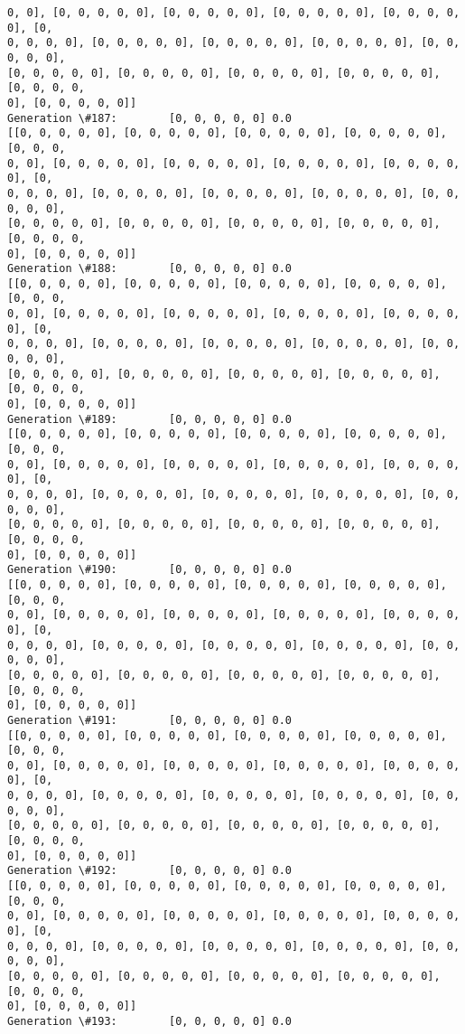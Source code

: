 \documentclass[11pt]{article}
\begin{document}
\begin{Verbatim}[commandchars=\\\{\}]
0, 0], [0, 0, 0, 0, 0], [0, 0, 0, 0, 0], [0, 0, 0, 0, 0], [0, 0, 0, 0, 0], [0,
0, 0, 0, 0], [0, 0, 0, 0, 0], [0, 0, 0, 0, 0], [0, 0, 0, 0, 0], [0, 0, 0, 0, 0],
[0, 0, 0, 0, 0], [0, 0, 0, 0, 0], [0, 0, 0, 0, 0], [0, 0, 0, 0, 0], [0, 0, 0, 0,
0], [0, 0, 0, 0, 0]]
Generation \#187:        [0, 0, 0, 0, 0] 0.0
[[0, 0, 0, 0, 0], [0, 0, 0, 0, 0], [0, 0, 0, 0, 0], [0, 0, 0, 0, 0], [0, 0, 0,
0, 0], [0, 0, 0, 0, 0], [0, 0, 0, 0, 0], [0, 0, 0, 0, 0], [0, 0, 0, 0, 0], [0,
0, 0, 0, 0], [0, 0, 0, 0, 0], [0, 0, 0, 0, 0], [0, 0, 0, 0, 0], [0, 0, 0, 0, 0],
[0, 0, 0, 0, 0], [0, 0, 0, 0, 0], [0, 0, 0, 0, 0], [0, 0, 0, 0, 0], [0, 0, 0, 0,
0], [0, 0, 0, 0, 0]]
Generation \#188:        [0, 0, 0, 0, 0] 0.0
[[0, 0, 0, 0, 0], [0, 0, 0, 0, 0], [0, 0, 0, 0, 0], [0, 0, 0, 0, 0], [0, 0, 0,
0, 0], [0, 0, 0, 0, 0], [0, 0, 0, 0, 0], [0, 0, 0, 0, 0], [0, 0, 0, 0, 0], [0,
0, 0, 0, 0], [0, 0, 0, 0, 0], [0, 0, 0, 0, 0], [0, 0, 0, 0, 0], [0, 0, 0, 0, 0],
[0, 0, 0, 0, 0], [0, 0, 0, 0, 0], [0, 0, 0, 0, 0], [0, 0, 0, 0, 0], [0, 0, 0, 0,
0], [0, 0, 0, 0, 0]]
Generation \#189:        [0, 0, 0, 0, 0] 0.0
[[0, 0, 0, 0, 0], [0, 0, 0, 0, 0], [0, 0, 0, 0, 0], [0, 0, 0, 0, 0], [0, 0, 0,
0, 0], [0, 0, 0, 0, 0], [0, 0, 0, 0, 0], [0, 0, 0, 0, 0], [0, 0, 0, 0, 0], [0,
0, 0, 0, 0], [0, 0, 0, 0, 0], [0, 0, 0, 0, 0], [0, 0, 0, 0, 0], [0, 0, 0, 0, 0],
[0, 0, 0, 0, 0], [0, 0, 0, 0, 0], [0, 0, 0, 0, 0], [0, 0, 0, 0, 0], [0, 0, 0, 0,
0], [0, 0, 0, 0, 0]]
Generation \#190:        [0, 0, 0, 0, 0] 0.0
[[0, 0, 0, 0, 0], [0, 0, 0, 0, 0], [0, 0, 0, 0, 0], [0, 0, 0, 0, 0], [0, 0, 0,
0, 0], [0, 0, 0, 0, 0], [0, 0, 0, 0, 0], [0, 0, 0, 0, 0], [0, 0, 0, 0, 0], [0,
0, 0, 0, 0], [0, 0, 0, 0, 0], [0, 0, 0, 0, 0], [0, 0, 0, 0, 0], [0, 0, 0, 0, 0],
[0, 0, 0, 0, 0], [0, 0, 0, 0, 0], [0, 0, 0, 0, 0], [0, 0, 0, 0, 0], [0, 0, 0, 0,
0], [0, 0, 0, 0, 0]]
Generation \#191:        [0, 0, 0, 0, 0] 0.0
[[0, 0, 0, 0, 0], [0, 0, 0, 0, 0], [0, 0, 0, 0, 0], [0, 0, 0, 0, 0], [0, 0, 0,
0, 0], [0, 0, 0, 0, 0], [0, 0, 0, 0, 0], [0, 0, 0, 0, 0], [0, 0, 0, 0, 0], [0,
0, 0, 0, 0], [0, 0, 0, 0, 0], [0, 0, 0, 0, 0], [0, 0, 0, 0, 0], [0, 0, 0, 0, 0],
[0, 0, 0, 0, 0], [0, 0, 0, 0, 0], [0, 0, 0, 0, 0], [0, 0, 0, 0, 0], [0, 0, 0, 0,
0], [0, 0, 0, 0, 0]]
Generation \#192:        [0, 0, 0, 0, 0] 0.0
[[0, 0, 0, 0, 0], [0, 0, 0, 0, 0], [0, 0, 0, 0, 0], [0, 0, 0, 0, 0], [0, 0, 0,
0, 0], [0, 0, 0, 0, 0], [0, 0, 0, 0, 0], [0, 0, 0, 0, 0], [0, 0, 0, 0, 0], [0,
0, 0, 0, 0], [0, 0, 0, 0, 0], [0, 0, 0, 0, 0], [0, 0, 0, 0, 0], [0, 0, 0, 0, 0],
[0, 0, 0, 0, 0], [0, 0, 0, 0, 0], [0, 0, 0, 0, 0], [0, 0, 0, 0, 0], [0, 0, 0, 0,
0], [0, 0, 0, 0, 0]]
Generation \#193:        [0, 0, 0, 0, 0] 0.0

\end{Verbatim}
\end{document}
